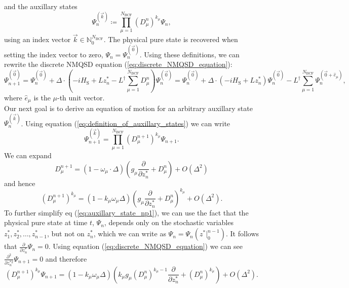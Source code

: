 and the auxillary states
\begin{equation}
    \label{eq:definition_of_auxillary_states}
    \Psi_n^{(\vec{k})} \coloneqq \prod_{\mu=1}^{N_\text{BCF}} \left(D_\mu^n\right)^{k_\mu}\Psi_n,
\end{equation}
using an index vector $\vec{k}\in\mathbb{N}_0^{N_\text{BCF}}$. The physical pure state is
recovered when setting the index vector to zero, $\Psi_n = \Psi_n^{(\vec{0})}$.
Using these definitions, we can rewrite the discrete NMQSD equation (\ref{eq:discrete_NMQSD_equation}):
\begin{equation*}
    \Psi_{n+1}^{(\vec{0})} = \Psi_{n}^{(\vec{0})} + \Delta \cdot \left(
        -iH_\text{S} + Lz_n^* - L^\dagger\sum_{\mu=1}^{N_\text{BCF}}D_\mu^n
    \right) \Psi_{n}^{(\vec{0})}
    = \Psi_{n}^{(\vec{0})} + \Delta \cdot \left(
        -iH_\text{S} + Lz_n^*
    \right) \Psi_{n}^{(\vec{0})} - L^\dagger\sum_{\mu=1}^{N_\text{BCF}}\Psi_n^{(\vec{0}+\hat{e}_\mu)},
\end{equation*}
where $\hat{e}_\mu$ is the $\mu$-th unit vector.
\\
Our next goal is to derive an equation of motion for an arbitrary auxillary state $\Psi_n^{(\vec{k})}$.
Using equation (\ref{eq:definition_of_auxillary_states}) we can write
\begin{equation}
    \label{eq:auxillary_state_np1}
    \Psi_{n+1}^{(\vec{k})} = \prod_{\mu=1}^{N_\text{BCF}} \left(D_\mu^{n+1}\right)^{k_\mu} \Psi_{n+1}.
\end{equation}
We can expand
\begin{equation*}
    D_\mu^{n+1} = \left(1-\omega_\mu\cdot\Delta\right)\left(g_\mu\frac{\partial}{\partial z_n^*} + D_\mu^n\right) + O\left(\Delta^2\right)
\end{equation*}
and hence
\begin{equation*}
    \left(D_\mu^{n+1}\right)^{k_\mu} = 
    \left(1-k_\mu\omega_\mu\Delta\right)
    \left(g_\mu\frac{\partial}{\partial z_n^*} + D_\mu^n\right)^{k_\mu} + O\left(\Delta^2\right).
\end{equation*}
To further simplify eq (\ref{eq:auxillary_state_np1}), we can use the fact that the physical pure state
at time $t$, $\Psi_n$, depends only on the stochastic variables $z_1^*, z_2^*, \dots, z_{n-1}^*$, but not
on $z_n^*$, which we can write as $\Psi_n=\Psi_n\left(z^*|_0^{n-1}\right)$. It follows that
$\frac{\partial}{\partial z_n^*}\Psi_n = 0$. Using equation (\ref{eq:discrete_NMQSD_equation})
we can see $\frac{\partial^2}{\partial z_n^{*2}}\Psi_{n+1} = 0$ and therefore
\begin{equation}
    \label{eq:simplification_of_D_psi_np1}
    \left(D_\mu^{n+1}\right)^{k_\mu} \Psi_{n+1} = \left(1-k_\mu\omega_\mu\Delta\right)
    \left(k_\mu g_\mu \left(D_\mu^n\right)^{k_\mu-1}\frac{\partial}{\partial z_n^*} + \left(D_\mu^n\right)^{k_\mu}\right) + O\left(\Delta^2\right).
\end{equation}
